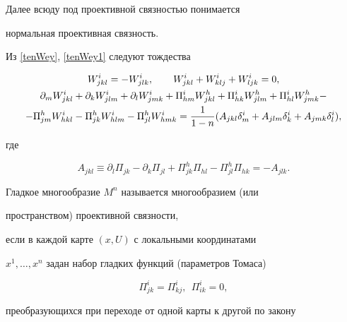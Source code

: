 Далее всюду под проективной связностью понимается


нормальная проективная связность.





Из \eqref{tenWey}, \eqref{tenWey1} следуют тождества


\begin{gather}


W^i_{jkl}=-W^i_{jlk},\qquad W^i_{jkl}+W^i_{klj}+W^i_{ljk}=0,\notag \\


%


\partial_mW^i_{jkl}+\partial_kW^i_{jlm}+\partial_lW^i_{jmk}+


\Pi^i_{hm}W^h_{jkl} +\Pi^i_{hk}W^h_{jlm}+\Pi^i_{hl}W^h_{jmk}-\notag \\


%


\label{idWey}


-\Pi^h_{jm}W^i_{hkl}-\Pi^h_{jk}W^i_{hlm} -\Pi^h_{jl}W^i_{hmk}=


\frac{1}{1-n}(A_{jkl}\delta^i_m+ A_{jlm}\delta^i_k+A_{jmk}\delta^i_l),


\end{gather}


где


\begin{equation}\label{Ajkl}


A_{jkl}\equiv\partial_l\Pi_{jk}-\partial_k\Pi_{jl}+


\Pi^h_{jk}\Pi_{hl}-\Pi^h_{jl}\Pi_{hk}=-A_{jlk}.


\end{equation}





Гладкое многообразие $M^n$ называется многообразием (или


пространством) проективной связности,


если в каждой карте $(x,U)$ с локальными координатами


$x^1,\dotsc,x^n$ задан набор гладких функций (параметров Томаса)


$$


\Pi^i_{jk}=\Pi^i_{kj}, \ \ \Pi^i_{ik}=0,


$$ 


преобразующихся при переходе от одной карты к другой по закону


